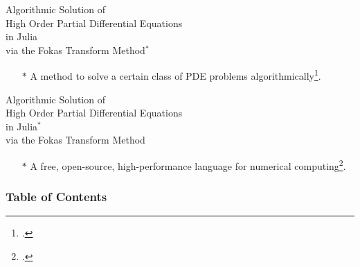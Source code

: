 \documentclass{beamer}
\begin{document}
\begin{frame}[t]
    \begin{tcolorbox}[colback=white,colframe=gray!40, arc=0pt, outer arc=0pt]
        \begin{center}
            \Large Algorithmic Solution {\color{lightgray}of \\
            High Order Partial Differential Equations\\
            in Julia}\\
            via the Fokas Transform Method$^*$
        \end{center}
    \end{tcolorbox}
    
    \begin{itemize}
        \item[$*$] A method to solve a certain class of PDE problems algorithmically\footcite{Fokas2008}.
    \end{itemize}
\end{frame}

\begin{frame}[t]
    \begin{tcolorbox}[colback=white,colframe=gray!40, arc=0pt, outer arc=0pt]
        \begin{center}
            \Large{\color{lightgray}Algorithmic Solution of \\
            High Order Partial Differential Equations}\\
            in Julia$^*$\\
            {\color{lightgray}via the Fokas Transform Method}
        \end{center}
    \end{tcolorbox}

    \begin{itemize}
        \item[$*$] A free, open-source, high-performance language for numerical computing\footcite{julia}.
    \end{itemize}
\end{frame}

\begin{frame}
    \frametitle{Table of Contents} %
    \tableofcontents %
\end{frame}
\end{document}
